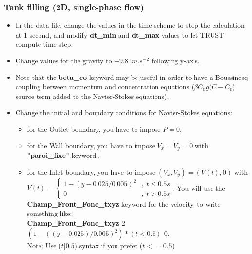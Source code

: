 \documentclass[10pt, hyperref={unicode=true,pdfusetitle, bookmarks=true,bookmarksnumbered=false,bookmarksopen=false, breaklinks=false,pdfborder={0 0l 1},backref=true,colorlinks=true,linkcolor=darkblue,pageanchor}]{beamer}
\begin{document}
\begin{frame}
\frametitle{Tank filling (2D, single-phase flow)}
\begin{block}{}

\begin{itemize}
\item In the data file, change the values in the time scheme to stop the calculation at 1
second, and modify \textbf{dt\_min} and \textbf{dt\_max} values to let TRUST compute time step.

\item Change values for the gravity to $-9.81 m.s^{-2}$ following y-axis.

\item Note that the \textbf{beta\_co} keyword may be useful in order to have a Boussinesq coupling between momentum and concentration equations ($\beta C_0 g(C-C_0$) source term added to the Navier-Stokes equations).

\item Change the initial and boundary conditions for Navier-Stokes equations:
    \begin{itemize}
    \item [$\circ$] for the Outlet boundary, you have to impose $P=0$,
    \item [$\circ$] for the Wall boundary, you have to impose $V_x=V_y=0$ with \textbf{"paroi\_fixe"} keyword.,
    \item [$\circ$] for the Inlet boundary, you have to impose $(V_{x},V_{y})=(V(t),0)$ with 
    $V(t)=  
    \begin{cases}  
    1-(y-0.025/0.005)^{2} & ,\; t\leq0.5s\\
    0 & ,\; t>0.5s
    \end{cases}
    $. You will use the \textbf{Champ\_Front\_Fonc\_txyz} keyword for the velocity, to write something like: \\
    \textbf{Champ\_Front\_Fonc\_txyz $2$ $(1-((y-0.025)/0.005)^2)*(t<0.5)$ $0.$}\\
    Note: Use ($t[0.5)$ syntax if you prefer ($t<=0.5$)
    \end{itemize}
\end{itemize}

\end{block}
\end{frame}
\end{document}
